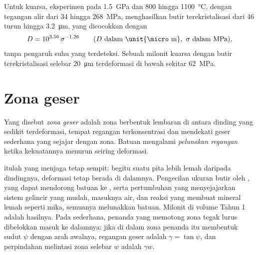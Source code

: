 Untuk kuarsa, eksperimen pada \qty{1.5}{GPa} dan 800 hingga \qty{1100}{\celsius}, dengan tegangan alir
dari 34 hingga \qty{268}{MPa}, menghasilkan butir terekristalisasi dari 46 turun
hingga \qty{3.2}{\micro m}, yang dicocokkan dengan
\[
  D = 10^{3.56}\,\sigma^{-1.26}\qquad(D\text{ dalam \unit{\micro m}},\ \sigma\text{ dalam MPa}),
\]
tanpa pengaruh suhu yang terdeteksi. Sebuah milonit kuarsa dengan
butir terekristalisasi selebar \qty{20}{\micro m} terdeformasi di bawah
sekitar \qty{62}{MPa}.

\section{Zona geser}

\begin{definition}\label{def:b3:deformation-mechanisms:shear-zone}
Yang disebut \emph{zona geser} adalah zona berbentuk lembaran di antara dinding yang
sedikit terdeformasi, tempat regangan terkonsentrasi dan mendekati geser sederhana yang sejajar dengan zona.
Batuan mengalami \emph{pelunakan
regangan} ketika kekuatannya menurun seiring deformasi.
\end{definition}

 itulah yang menjaga  tetap sempit: begitu suatu pita lebih lemah
daripada dindingnya, deformasi tetap berada di dalamnya. Pengecilan ukuran butir oleh
, yang dapat mendorong batuan ke , serta pertumbuhan
 yang menyejajarkan sistem gelincir yang mudah, masuknya air, dan
reaksi yang membuat mineral lemah seperti mika, semuanya melunakkan batuan. Milonit di
volume Tahun 1 adalah hasilnya. Pada  sederhana, penanda yang memotong zona
tegak lurus dibelokkan masuk ke dalamnya: jika di dalam zona penanda itu membentuk
sudut $\psi$ dengan arah awalnya, regangan geser adalah $\gamma
= \tan\psi$, dan perpindahan melintasi zona selebar $w$ adalah $\gamma w$.

